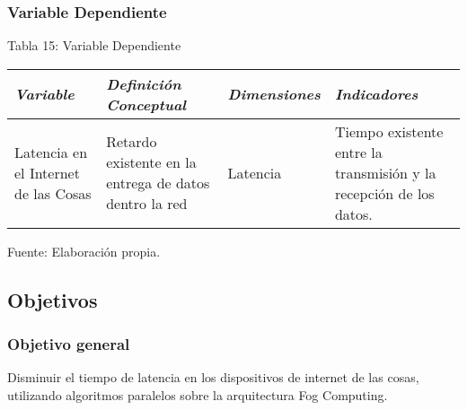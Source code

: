         \subsubsection{Variable Dependiente}
            \begin{table}[h!]
                \centering
                { Tabla 15: Variable Dependiente}\par
                \begin{tabular}{|p{3cm}|p{3cm}|p{3cm}|p{3cm}|} \hline
                    
                
                \textit{{\bf{Variable}}} &
                \textit{{\bf{Definición Conceptual}}} &
                \textit{{\bf{Dimensiones}}} &
                \textit{{\bf{Indicadores}}}
                \\ \hline

                Latencia en el Internet de las Cosas &
                Retardo existente en la entrega de datos dentro la red &
                Latencia &
                Tiempo existente entre la transmisión y la recepción de los datos. 
                \\ \hline

                \end{tabular}
                \begin{center}
                    \vskip -0.2cm
                    {\small{Fuente: Elaboración propia.}}
                \end{center}
            \end{table}
    \subsection{Objetivos}
        \subsubsection{Objetivo general}
            Disminuir el tiempo de latencia en los dispositivos de internet de las cosas, utilizando algoritmos paralelos sobre la arquitectura Fog Computing.
